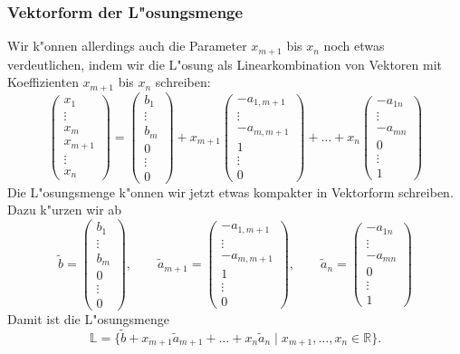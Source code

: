 \subsubsection{Vektorform der L"osungsmenge}
Wir k"onnen allerdings auch die Parameter $x_{m+1}$ bis $x_n$ noch
etwas verdeutlichen, indem wir die L"osung als Linearkombination von
Vektoren mit Koeffizienten $x_{m+1}$ bis $x_n$ schreiben:
\[
\begin{pmatrix}
x_1\\\vdots\\x_m\\x_{m+1}\\\vdots\\x_n
\end{pmatrix}
=
\begin{pmatrix}
b_1\\\vdots\\b_m\\0\\\vdots\\0
\end{pmatrix}
+x_{m+1}\begin{pmatrix}
-a_{1,m+1}\\ \vdots\\-a_{m,m+1}\\1\\\vdots\\0
\end{pmatrix}
+\dots+
x_n
\begin{pmatrix}
-a_{1n}\\
\vdots\\
-a_{mn}\\
0\\
\vdots\\
1
\end{pmatrix}
\]
Die L"osungsmenge k"onnen wir jetzt etwas kompakter in Vektorform schreiben.
Dazu k"urzen wir ab
\[
\tilde b
=
\begin{pmatrix}
b_1\\\vdots\\b_m\\0\\\vdots\\0
\end{pmatrix}
,\qquad
\tilde a_{m+1}=
\begin{pmatrix}
-a_{1,m+1}\\ \vdots\\-a_{m,m+1}\\1\\\vdots\\0
\end{pmatrix}
,\qquad
\tilde a_n
=
\begin{pmatrix}
-a_{1n}\\
\vdots\\
-a_{mn}\\
0\\
\vdots\\
1
\end{pmatrix}
\]
Damit ist die L"osungsmenge
\[
\mathbb L = \{
\tilde b+x_{m+1}\tilde a_{m+1}+\dots+x_n\tilde a_n\;|\;x_{m+1},\dots,x_n\in\mathbb R\}.
\]

